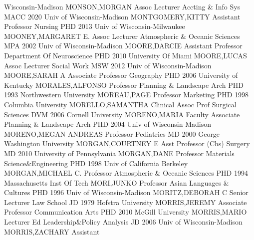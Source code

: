 \documentclass[
]{article}
\begin{document}
Wisconsin-Madison \textbar MONSON,MORGAN \textbar Assoc Lecturer
\textbar Accting \& Info Sys \textbar{}  \textbar MACC 2020
Univ of Wisconsin-Madison \textbar MONTGOMERY,KITTY \textbar Assistant
Professor \textbar Nursing \textbar{}  \textbar PHD 2013
Univ of Wisconsin-Milwaukee \textbar MOONEY,MARGARET E. \textbar Assoc
Lecturer \textbar Atmospheric \& Oceanic Sciences \textbar{}
 \textbar MPA 2002 Univ of Wisconsin-Madison
\textbar MOORE,DARCIE \textbar Assistant Professor \textbar Department
Of Neuroscience \textbar{}  \textbar PHD 2010 University Of
Miami \textbar MOORE,LUCAS \textbar Assoc Lecturer \textbar Social Work
\textbar{}  \textbar MSW 2012 Univ of Wisconsin-Madison
\textbar MOORE,SARAH A \textbar Associate Professor \textbar Geography
\textbar{}  \textbar PHD 2006 University of Kentucky
\textbar MORALES,ALFONSO \textbar Professor \textbar Planning \&
Landscape Arch \textbar{}  \textbar PHD 1993 Northwestern
University \textbar MOREAU,PAGE \textbar Professor \textbar Marketing
\textbar{}  \textbar PHD 1998 Columbia University
\textbar MORELLO,SAMANTHA \textbar Clinical Assoc Prof \textbar Surgical
Sciences \textbar{}  \textbar DVM 2006 Cornell University
\textbar MORENO,MARIA \textbar Faculty Associate \textbar Planning \&
Landscape Arch \textbar{}  \textbar PHD 2004 Univ of
Wisconsin-Madison \textbar MORENO,MEGAN ANDREAS \textbar Professor
\textbar Pediatrics \textbar{}  \textbar MD 2000 George
Washington University \textbar MORGAN,COURTNEY E \textbar Asst Professor
(Chs) \textbar Surgery \textbar{}  \textbar MD 2010
University of Pennsylvania \textbar MORGAN,DANE \textbar Professor
\textbar Materials Science\&Engineering \textbar{} 
\textbar PHD 1998 Univ of California Berkeley \textbar MORGAN,MICHAEL C.
\textbar Professor \textbar Atmospheric \& Oceanic Sciences \textbar{}
 \textbar PHD 1994 Massachusetts Inst Of Tech
\textbar MORI,JUNKO \textbar Professor \textbar Asian Languages \&
Cultures \textbar{}  \textbar PHD 1996 Univ of
Wisconsin-Madison \textbar MORITZ,DEBORAH C \textbar Senior Lecturer
\textbar Law School \textbar{}  \textbar JD 1979 Hofstra
University \textbar MORRIS,JEREMY \textbar Associate Professor
\textbar Communication Arts \textbar{}  \textbar PHD 2010
McGill University \textbar MORRIS,MARIO \textbar Lecturer \textbar Ed
Leadership\&Policy Analysis \textbar{}  \textbar JD 2006
Univ of Wisconsin-Madison \textbar MORRIS,ZACHARY \textbar Assistant
\end{document}
